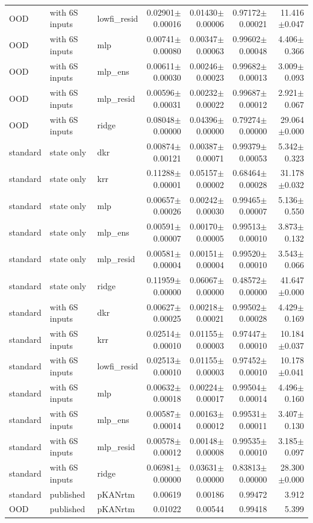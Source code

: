 \begin{landscape}
{\begin{longtable}{lllrrrr}
OOD & with 6S inputs & lowfi\_resid & 0.02901$\pm$0.00016 & 0.01430$\pm$0.00006 & 0.97172$\pm$0.00021 & 11.416$\pm$0.047 \\
OOD & with 6S inputs & mlp & 0.00741$\pm$0.00080 & 0.00347$\pm$0.00063 & 0.99602$\pm$0.00048 & 4.406$\pm$0.366 \\
OOD & with 6S inputs & mlp\_ens & 0.00611$\pm$0.00030 & 0.00246$\pm$0.00023 & 0.99682$\pm$0.00013 & 3.009$\pm$0.093 \\
OOD & with 6S inputs & mlp\_resid & 0.00596$\pm$0.00031 & 0.00232$\pm$0.00022 & 0.99687$\pm$0.00012 & 2.921$\pm$0.067 \\
OOD & with 6S inputs & ridge & 0.08048$\pm$0.00000 & 0.04396$\pm$0.00000 & 0.79274$\pm$0.00000 & 29.064$\pm$0.000 \\
standard & state only & dkr & 0.00874$\pm$0.00121 & 0.00387$\pm$0.00071 & 0.99379$\pm$0.00053 & 5.342$\pm$0.323 \\
standard & state only & krr & 0.11288$\pm$0.00001 & 0.05157$\pm$0.00002 & 0.68464$\pm$0.00028 & 31.178$\pm$0.032 \\
standard & state only & mlp & 0.00657$\pm$0.00026 & 0.00242$\pm$0.00030 & 0.99465$\pm$0.00007 & 5.136$\pm$0.550 \\
standard & state only & mlp\_ens & 0.00591$\pm$0.00007 & 0.00170$\pm$0.00005 & 0.99513$\pm$0.00010 & 3.873$\pm$0.132 \\
standard & state only & mlp\_resid & 0.00581$\pm$0.00004 & 0.00151$\pm$0.00004 & 0.99520$\pm$0.00010 & 3.543$\pm$0.066 \\
standard & state only & ridge & 0.11959$\pm$0.00000 & 0.06067$\pm$0.00000 & 0.48572$\pm$0.00000 & 41.647$\pm$0.000 \\
standard & with 6S inputs & dkr & 0.00627$\pm$0.00025 & 0.00218$\pm$0.00021 & 0.99502$\pm$0.00028 & 4.429$\pm$0.169 \\
standard & with 6S inputs & krr & 0.02514$\pm$0.00010 & 0.01155$\pm$0.00003 & 0.97447$\pm$0.00010 & 10.184$\pm$0.037 \\
standard & with 6S inputs & lowfi\_resid & 0.02513$\pm$0.00010 & 0.01155$\pm$0.00003 & 0.97452$\pm$0.00010 & 10.178$\pm$0.041 \\
standard & with 6S inputs & mlp & 0.00632$\pm$0.00018 & 0.00224$\pm$0.00017 & 0.99504$\pm$0.00014 & 4.496$\pm$0.160 \\
standard & with 6S inputs & mlp\_ens & 0.00587$\pm$0.00014 & 0.00163$\pm$0.00012 & 0.99531$\pm$0.00011 & 3.407$\pm$0.130 \\
standard & with 6S inputs & mlp\_resid & 0.00578$\pm$0.00012 & 0.00148$\pm$0.00008 & 0.99535$\pm$0.00010 & 3.185$\pm$0.097 \\
standard & with 6S inputs & ridge & 0.06981$\pm$0.00000 & 0.03631$\pm$0.00000 & 0.83813$\pm$0.00000 & 28.300$\pm$0.000 \\
standard & published & pKANrtm & 0.00619 & 0.00186 & 0.99472 & 3.912 \\
OOD & published & pKANrtm & 0.01022 & 0.00544 & 0.99418 & 5.399 \\
\end{longtable}}
\end{landscape}
